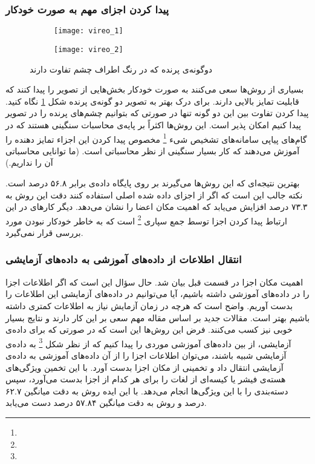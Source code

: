 \documentclass[11pt]{article}
\begin{document}
\subsubsection{پیدا کردن اجزای مهم به صورت خودکار}
\begin{figure}[t]
	\centering
	\begin{subfigure}[h]{0.35\textwidth}
		\centering
		\texttt{[image: vireo\_1]}
		\caption{}
	\end{subfigure}
	\begin{subfigure}[h]{0.35\textwidth}
		\centering
		\texttt{[image: vireo\_2]}
		\caption{}
	\end{subfigure}
	\caption{دوگونه‌ی پرنده که در رنگ اطراف چشم تفاوت دارند}
	\label{fig:fg_class:part_diff}
\end{figure}
بسیاری از روش‌ها
\cite{yao2011, yao2012, style_aware, poof}
سعی می‌کنند به صورت خودکار بخش‌هایی از تصویر را پیدا کنند که قابلیت تمایز بالایی دارند. برای درک بهتر به تصویر دو گونه‌ی پرنده شکل
\ref{fig:fg_class:part_diff}
نگاه کنید. پیدا کردن تفاوت بین این دو گونه تنها در صورتی که بتوانیم چشم‌های پرنده را در تصویر پیدا کنیم امکان پذیر است. این روش‌ها اکثراً بر پایه‌ی محاسبات سنگینی هستند که در گام‌های پیاپی سامانه‌های تشخیص شیء
\footnote{} مخصوص پیدا کردن این اجزاء تمایز دهنده را آموزش می‌دهند که کار بسیار سنگینی از نظر محاسباتی است.
(ما توانایی محاسباتی آن را نداریم.)

بهترین نتیجه‌ای که این روش‌ها می‌گیرند
\cite{poof}
بر روی پایگاه داده‌ی
\cite{cub2002011}
برابر ۵۶.۸ درصد است.
نکته جالب این است که اگر از اجزای داده شده اصلی استفاده کنند دقت این روش به ۷۳.۳ درصد افزایش می‌یابد که اهمیت مکان اعضا را نشان می‌دهد.
دیگر کارهای در این ارتباط پیدا کردن اجزا توسط جمع سپاری
\footnote{}
است
\cite{deng2013}
که به خاطر خودکار نبودن مورد بررسی قرار نمی‌گیرد.

\subsubsection{انتقال اطلاعات از داده‌های آموزشی به داده‌های آزمایشی}
اهمیت مکان اجزا در قسمت قبل بیان شد. حال سؤال این است که اگر اطلاعات اجزا را در داده‌های آموزشی داشته باشیم، آیا می‌توانیم در داده‌های آزمایشی این اطلاعات را بدست آوریم. واضح است که هرچه در زمان آزمایش نیاز به اطلاعات کمتری داشته باشیم بهتر است. مقالات جدید
\cite{gavves2013, goring2014}
بر اساس مقاله مهم
\cite{esvm}
سعی بر این کار دارند و نتایج بسیار خوبی نیز کسب می‌کنند. فرض این روش‌ها این است که در صورتی که برای داده‌ی آزمایشی، از بین داده‌های آموزشی موردی را پیدا کنیم که از نظر شکل
\footnote{}
به داده‌ی آزمایشی شبیه باشند، می‌توان اطلاعات اجزا را از آن داده‌های آموزشی به داده‌ی آزمایشی انتقال داد و تخمینی از مکان اجزا بدست آورد. با این تخمین ویژگی‌های هسته‌ی فیشر یا کیسه‌ای از لغات را برای هر کدام از اجزا بدست می‌آورد، سپس دسته‌بندی را با این ویژگی‌ها انجام می‌دهد. با این ایده روش
\cite{gavves2013}
به دقت میانگین ۶۲.۷ درصد و روش
\cite{goring2014}
به دقت میانگین ۵۷.۸۴ درصد دست می‌یابد.
\end{document}
